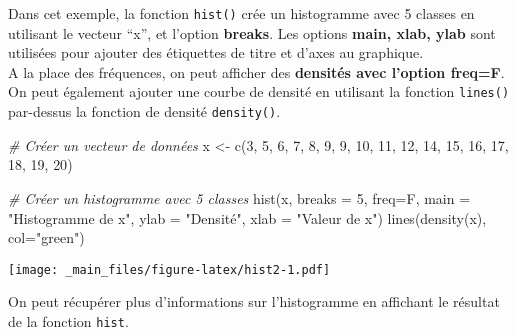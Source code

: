 \documentclass[
]{article}
\newenvironment{Shaded}{\begin{snugshade}}{\end{snugshade}}
\newcommand{\AttributeTok}[1]{\textcolor[rgb]{0.77,0.63,0.00}{#1}}
\newcommand{\CommentTok}[1]{\textcolor[rgb]{0.56,0.35,0.01}{\textit{#1}}}
\newcommand{\DecValTok}[1]{\textcolor[rgb]{0.00,0.00,0.81}{#1}}
\newcommand{\FunctionTok}[1]{\textcolor[rgb]{0.00,0.00,0.00}{#1}}
\newcommand{\NormalTok}[1]{#1}
\newcommand{\OtherTok}[1]{\textcolor[rgb]{0.56,0.35,0.01}{#1}}
\newcommand{\StringTok}[1]{\textcolor[rgb]{0.31,0.60,0.02}{#1}}
\begin{document}
Dans cet exemple, la fonction \texttt{hist()} crée un histogramme avec 5 classes en utilisant le vecteur ``x'', et l'option \textbf{breaks}. Les options \textbf{main, xlab, ylab} sont utilisées pour ajouter des étiquettes de titre et d'axes au graphique.\\
A la place des fréquences, on peut afficher des \textbf{densités avec l'option freq=F}. On peut également ajouter une courbe de densité en utilisant la fonction \texttt{lines()} par-dessus la fonction de densité \texttt{density()}.

\begin{Shaded}
\begin{Highlighting}[]
\CommentTok{\# Créer un vecteur de données}
\NormalTok{x }\OtherTok{\textless{}{-}} \FunctionTok{c}\NormalTok{(}\DecValTok{3}\NormalTok{, }\DecValTok{5}\NormalTok{, }\DecValTok{6}\NormalTok{, }\DecValTok{7}\NormalTok{, }\DecValTok{8}\NormalTok{, }\DecValTok{9}\NormalTok{, }\DecValTok{9}\NormalTok{, }\DecValTok{10}\NormalTok{, }\DecValTok{11}\NormalTok{, }\DecValTok{12}\NormalTok{, }\DecValTok{14}\NormalTok{, }\DecValTok{15}\NormalTok{, }\DecValTok{16}\NormalTok{, }\DecValTok{17}\NormalTok{, }\DecValTok{18}\NormalTok{, }\DecValTok{19}\NormalTok{, }\DecValTok{20}\NormalTok{)}

\CommentTok{\# Créer un histogramme avec 5 classes}
\FunctionTok{hist}\NormalTok{(x, }\AttributeTok{breaks =} \DecValTok{5}\NormalTok{, }\AttributeTok{freq=}\NormalTok{F, }\AttributeTok{main =} \StringTok{"Histogramme de x"}\NormalTok{, }\AttributeTok{ylab =} \StringTok{"Densité"}\NormalTok{, }\AttributeTok{xlab =} \StringTok{"Valeur de x"}\NormalTok{)}
\FunctionTok{lines}\NormalTok{(}\FunctionTok{density}\NormalTok{(x), }\AttributeTok{col=}\StringTok{"green"}\NormalTok{)}
\end{Highlighting}
\end{Shaded}

\texttt{[image: \_main\_files/figure-latex/hist2-1.pdf]}

On peut récupérer plus d'informations sur l'histogramme en affichant le résultat de la fonction \texttt{hist}.
\end{document}
